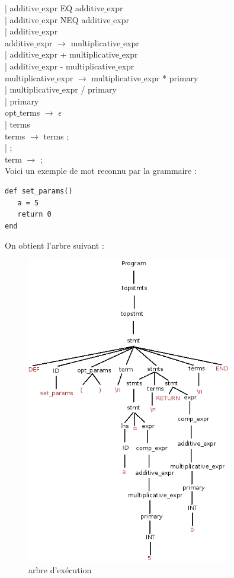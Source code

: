 \documentclass{article}
\begin{document}
| additive$\_$expr EQ additive$\_$expr \\  
| additive$\_$expr NEQ additive$\_$expr \\  
| additive$\_$expr  \\
additive$\_$expr $\rightarrow$  multiplicative$\_$expr \\ 
| additive$\_$expr + multiplicative$\_$expr \\
| additive$\_$expr - multiplicative$\_$expr \\
multiplicative$\_$expr $\rightarrow$ multiplicative$\_$expr * primary \\
| multiplicative$\_$expr / primary \\
| primary \\
opt$\_$terms $\rightarrow$ $\epsilon$ \\
| terms		\\
terms $\rightarrow$ terms ; \\
| ; \\
term $\rightarrow$ ; \\

Voici un exemple de mot reconnu par la grammaire :
\begin{verbatim}
def set_params()
   a = 5
   return 0
end 
\end{verbatim}

On obtient l'arbre suivant :

\newpage
\begin{figure}[!h]
\includegraphics[width=0.8\textwidth]{Diagramme1.png}
\caption{arbre d'exécution}
\end{figure}
\end{document}

